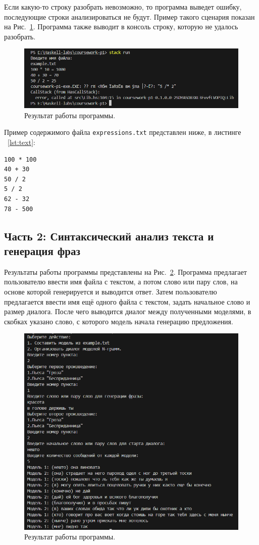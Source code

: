 \documentclass[a4paper, final]{article}
\begin{document}
Если какую-то строку разобрать невозможно, то программа выведет ошибку, последующие строки анализироваться не будут. Пример такого сценария показан на Рис.~\ref{fig:pic2}. Программа также выводит в консоль строку, которую не удалось разобрать.

\begin{figure}[H]
	\centering
	\includegraphics[width=0.8 \linewidth]{img/pic2.png}
	\caption{Результат работы программы.}
	\label{fig:pic2}
\end{figure}


Пример содержимого файла \texttt{expressions.txt} представлен ниже, в листинге ~\ref{lst:text}:

\begin{lstlisting}[caption={Код функции main}, label={lst:text}]
100 * 100
40 + 30
50 / 2
5 / 2
62 - 32
78 - 500
\end{lstlisting}

\subsection{Часть 2: Синтаксический анализ текста и генерация фраз}
Результаты работы программы представлены на Рис.~\ref{fig:pic3}. Программа предлагает пользователю ввести имя файла с текстом, а потом слово или пару слов, на основе которой генерируется и выводится ответ. Затем пользователю предлагается ввести имя ещё одного файла с текстом, задать начальное слово и размер диалога. После чего выводится диалог между полученными моделями, в скобках указано слово, с которого модель начала генерацию предложения.

\begin{figure}[H]
	\centering
	\includegraphics[width=0.8 \linewidth]{img/pic3.png}
	\caption{Результат работы программы.}
	\label{fig:pic3}
\end{figure}
\end{document}
